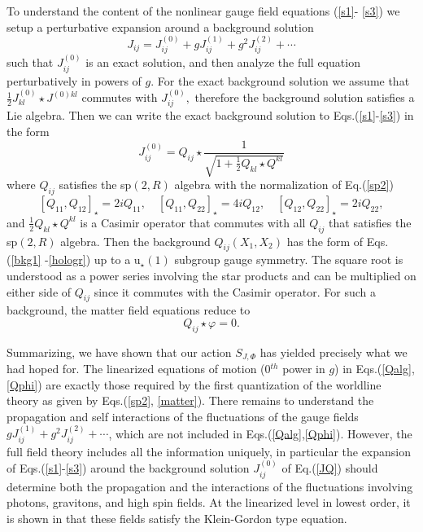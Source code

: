 \documentclass[a4paper,12pt]{article}
\begin{document}
To understand the content of the nonlinear gauge field equations
(\ref{s1}- \ref{s3}) we setup a perturbative expansion around a
background solution
\begin{equation}
J_{ij}=J_{ij}^{\left( 0\right) }+gJ_{ij}^{\left( 1\right)
}+g^{2}J_{ij}^{\left( 2\right) }+\cdots
\end{equation}
such that $J_{ij}^{\left( 0\right) }$ is an exact solution, and
then analyze the full equation perturbatively in powers of $g.$
For the exact background solution we assume that
$\frac{1}{2}J_{kl}^{\left( 0\right) }\star J^{(0)kl}$ commutes
with $J_{ij}^{\left( 0\right) },$ therefore the background
solution satisfies a Lie algebra. Then we can write the exact
background solution to Eqs.(\ref{s1}-\ref{s3}) in the form
\begin{equation}
J_{ij}^{\left( 0\right) }=Q_{ij}\star \frac{1}{\sqrt{1+\frac{1}{2}
Q_{kl}\star Q^{kl}}}  \label{JQ}
\end{equation}
where $Q_{ij}$ satisfies the sp$\left( 2,R\right) $ algebra with
the normalization of Eq.(\ref{sp2})
\begin{equation}
\left[ Q_{11},Q_{12}\right] _{\star }=2iQ_{11},\quad \left[
Q_{11},Q_{22} \right] _{\star }=4iQ_{12},\quad \left[
Q_{12},Q_{22}\right] _{\star }=2iQ_{22},  \label{Qalg}
\end{equation}
and $\frac{1}{2}Q_{kl}\star Q^{kl}$ is a Casimir operator that
commutes with all $Q_{ij}$ that satisfies the sp$\left( 2,R\right)
$ algebra. Then the background $Q_{ij}\left( X_{1},X_{2}\right) $
has the form of Eqs.(\ref{bkg1} -\ref{hologr}) up to a u$_{\star
}\left( 1\right) $ subgroup gauge symmetry. The square root is
understood as a power series involving the star products and can
be multiplied on either side of $Q_{ij}$ since it commutes with
the Casimir operator. For such a background, the matter field
equations reduce to
\begin{equation}
Q_{ij}\star \varphi =0.  \label{Qphi}
\end{equation}

Summarizing, we have shown that our action $S_{J,\Phi }$ has
yielded precisely what we had hoped for. The linearized equations
of motion (0$^{th}$ power in $g$) in Eqs.(\ref{Qalg},\ref{Qphi})
are exactly those required by the first quantization of the
worldline theory as given by Eqs.(\ref{sp2}, \ref{matter}). There
remains to understand the propagation and self interactions of the
fluctuations of the gauge fields $gJ_{ij}^{\left( 1\right)
}+g^{2}J_{ij}^{\left( 2\right) }+\cdots $, which are not included
in Eqs.(\ref{Qalg},\ref{Qphi}). However, the full field theory
includes all the information uniquely, in particular the expansion
of Eqs.(\ref{s1}-\ref {s3}) around the background solution
$J_{ij}^{\left( 0\right) }$ of Eq.(\ref {JQ}) should determine
both the propagation and the interactions of the fluctuations
involving photons, gravitons, and high spin fields. At the
linearized level in lowest order, it is shown in \cite{NCu11} that
these fields satisfy the Klein-Gordon type equation.
\end{document}
